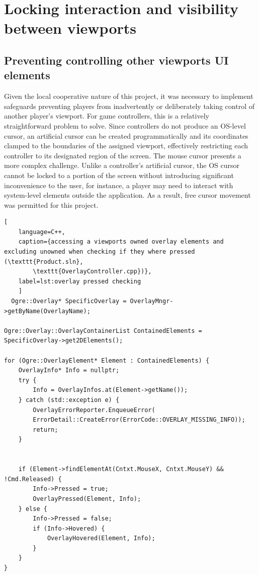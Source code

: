 \documentclass[]{final_report}
\begin{document}
\section {Locking interaction and visibility between viewports}
\subsection {Preventing controlling other viewports UI elements}
Given the local cooperative nature of this project, it was necessary to implement safeguards preventing players from inadvertently or deliberately taking control of another player's viewport. \newline
For game controllers, this is a relatively straightforward problem to solve. Since controllers do not produce an OS-level cursor, an artificial cursor can be created programmatically and its coordinates clamped to the boundaries of the assigned viewport, effectively restricting each controller to its designated region of the screen. \newline
The mouse cursor presents a more complex challenge. Unlike a controller's artificial cursor, the OS cursor cannot be locked to a portion of the screen without introducing significant inconvenience to the user, for instance, a player may need to interact with system-level elements outside the application. As a result, free cursor movement was permitted for this project. \newline


\begin{lstlisting}[
	language=C++,
	caption={accessing a viewports owned overlay elements and excluding unowned when checking if they where pressed (\texttt{Product.sln}, 
		\texttt{OverlayController.cpp})},
	label=lst:overlay pressed checking
	]
  Ogre::Overlay* SpecificOverlay = OverlayMngr->getByName(OverlayName);

Ogre::Overlay::OverlayContainerList ContainedElements =
SpecificOverlay->get2DElements();

for (Ogre::OverlayElement* Element : ContainedElements) {
	OverlayInfo* Info = nullptr;
	try {
		Info = OverlayInfos.at(Element->getName());
	} catch (std::exception e) {
		OverlayErrorReporter.EnqueueError(
		ErrorDetail::CreateError(ErrorCode::OVERLAY_MISSING_INFO));
		return;
	}
	
	
	if (Element->findElementAt(Cntxt.MouseX, Cntxt.MouseY) && !Cmd.Released) {
		Info->Pressed = true;
		OverlayPressed(Element, Info);
	} else {
		Info->Pressed = false;
		if (Info->Hovered) {
			OverlayHovered(Element, Info);
		}
	}
}
\end{lstlisting}
\end{document}
